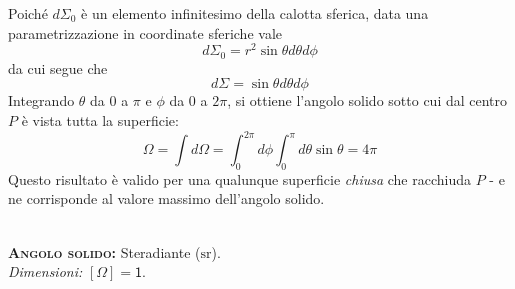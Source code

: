 Poiché $d\Sigma_0$ è un elemento infinitesimo della calotta sferica, data una parametrizzazione in coordinate sferiche vale
\begin{equation*}
	d\Sigma_0=r^2\sin\theta d\theta d\phi
\end{equation*}
da cui segue che
\begin{equation}
	d\Sigma=\sin\theta d\theta d\phi
\end{equation}
Integrando $\theta$ da $0$ a $\pi$ e $\phi$ da $0$ a $2\pi$, si ottiene l'angolo solido sotto cui dal centro $P$ è vista tutta la superficie:
\begin{equation}
	\Omega=\int d\Omega=\int_0^{2\pi}d\phi\int_0^\pi d\theta\sin\theta=4\pi
\end{equation}
Questo risultato è valido per una qualunque superficie \textit{chiusa} che racchiuda $P$ - e ne corrisponde al valore massimo dell'angolo solido.\\
\begin{units}~\\
	\textbf{\textsc{Angolo solido:}} Steradiante  ($\unit{\steradian}$).\\
	\textit{Dimensioni:} $[\Omega]=\mathsf{1}$.
\end{units}
